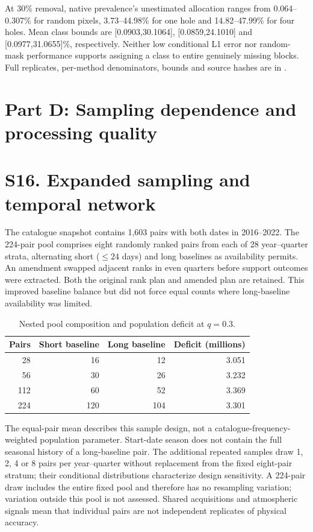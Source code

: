 \documentclass[10pt,a4paper]{article}
\newcommand{\SampleTwentyEight}{3.051}
\newcommand{\SampleFiftySix}{3.232}
\newcommand{\SampleOneTwelve}{3.369}
\newcommand{\SampleTwoTwentyFour}{3.301}
\begin{document}
At 30\% removal, native prevalence's unestimated allocation ranges from 0.064--0.307\% for random pixels, 3.73--44.98\% for one hole and 14.82--47.99\% for four holes. Mean class bounds are [0.0903,30.1064], [0.0859,24.1010] and [0.0977,31.0655]\%, respectively. Neither low conditional L1 error nor random-mask performance supports assigning a class to entire genuinely missing blocks. Full replicates, per-method denominators, bounds and source hashes are in .




\section*{Part D: Sampling dependence and processing quality}
\section*{S16. Expanded sampling and temporal network}
The catalogue snapshot contains 1,603 pairs with both dates in 2016--2022. The 224-pair pool comprises eight randomly ranked pairs from each of 28 year--quarter strata, alternating short ($\leq24$ days) and long baselines as availability permits. An amendment swapped adjacent ranks in even quarters before support outcomes were extracted. Both the original rank plan and amended plan are retained. This improved baseline balance but did not force equal counts where long-baseline availability was limited.

\begin{table}[htbp]\centering
\caption{Nested pool composition and population deficit at $q=0.3$.}
\begin{tabular}{rrrr}\toprule
Pairs & Short baseline & Long baseline & Deficit (millions)\\\midrule
28 & 16 & 12 & \SampleTwentyEight{}\\
56 & 30 & 26 & \SampleFiftySix{}\\
112 & 60 & 52 & \SampleOneTwelve{}\\
224 & 120 & 104 & \SampleTwoTwentyFour{}\\\bottomrule
\end{tabular}
\end{table}

The equal-pair mean describes this sample design, not a catalogue-frequency-weighted population parameter. Start-date season does not contain the full seasonal history of a long-baseline pair. The additional repeated samples draw 1, 2, 4 or 8 pairs per year--quarter without replacement from the fixed eight-pair stratum; their conditional distributions characterize design sensitivity. A 224-pair draw includes the entire fixed pool and therefore has no resampling variation; variation outside this pool is not assessed. Shared acquisitions and atmospheric signals mean that individual pairs are not independent replicates of physical accuracy.
\end{document}
